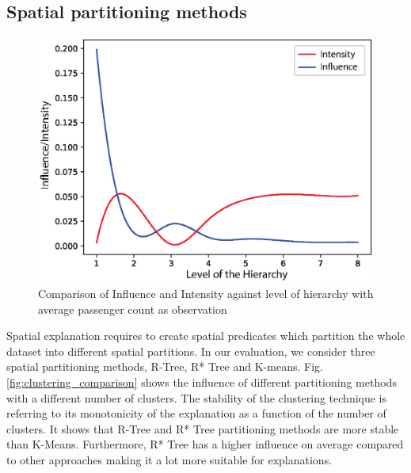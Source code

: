 \subsection{Spatial partitioning methods}
\label{sec:spatial_partitioning_methods}
\begin{figure}[t]
	\includegraphics[width=\columnwidth]{images/hieint_passenger_count}
	\caption{Comparison of Influence and Intensity against level of hierarchy with average passenger count as observation}
	\label{fig:hieint_passenger_count}
\end{figure}
Spatial explanation requires to create spatial predicates which partition the whole dataset into different spatial partitions. In our evaluation, we consider three spatial partitioning methods, R-Tree, R* Tree and K-means. 
Fig. \ref{fig:clustering_comparison} shows the influence of different partitioning methods with a different number of clusters. 
The stability of the clustering technique is referring to its monotonicity of the explanation as a function of the number of clusters. 
It shows that R-Tree and R* Tree partitioning methods are more stable than K-Means. 
Furthermore, R* Tree has a higher influence on average compared to other approaches making it a lot more suitable for explanations.

